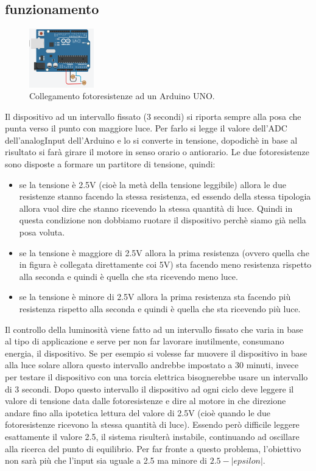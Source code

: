\documentclass[12pt,oneside,a4paper]{article}
\begin{document}
\subsection{funzionamento}
\begin{figure}
    \centering
    \includegraphics[width=0.25\textwidth]{figures/photoresistors}
    \caption{Collegamento fotoresistenze ad un Arduino UNO.}
\end{figure}
Il dispositivo ad un intervallo fissato (3 secondi) si riporta sempre alla posa che punta verso il punto con maggiore luce. Per farlo si legge il valore dell'ADC dell'analogInput dell'Arduino e lo si converte in tensione, dopodichè in base al risultato si farà girare il motore in senso orario o antiorario. Le due fotoresistenze sono disposte a formare un partitore di tensione, quindi:
\begin{itemize}
    \item se la tensione è 2.5V (cioè la metà della tensione leggibile) allora le due resistenze stanno facendo la stessa resistenza, ed essendo della stessa tipologia allora vuol dire che stanno ricevendo la stessa quantità di luce. Quindi in questa condizione non dobbiamo ruotare il dispositivo perchè siamo già nella posa voluta.
    \item se la tensione è maggiore di 2.5V allora la prima resistenza (ovvero quella che in figura è collegata direttamente coi 5V) sta facendo meno resistenza rispetto alla seconda e quindi è quella che sta ricevendo meno luce.
    \item se la tensione è minore di 2.5V allora la prima resistenza sta facendo più resistenza rispetto alla seconda e quindi è quella che sta ricevendo più luce.
\end{itemize}
Il controllo della luminosità viene fatto ad un intervallo fissato che varia in base al tipo di applicazione e serve per non far lavorare inutilmente, consumano energia, il dispositivo. Se per esempio si volesse far muovere il dispositivo in base alla luce solare allora questo intervallo andrebbe impostato a 30 minuti, invece per testare il dispositivo con una torcia elettrica bisognerebbe usare un intervallo di 3 secondi.
Dopo questo intervallo il dispositivo ad ogni ciclo deve leggere il valore di tensione data dalle fotoresistenze e dire al motore in che direzione andare fino alla ipotetica lettura del valore di 2.5V (cioè quando le due fotoresistenze ricevono la stessa quantità di luce). Essendo però difficile leggere esattamente il valore 2.5, il sistema risulterà instabile, continuando ad oscillare alla ricerca del punto di equilibrio. Per far fronte a questo problema, l'obiettivo non sarà più che l'input sia uguale a 2.5 ma minore di $2.5 - |epsilon|$.
\end{document}
